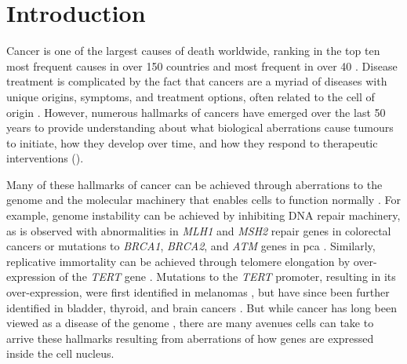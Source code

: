 \chapter{Introduction}
\label{chap:intro}

Cancer is one of the largest causes of death worldwide, ranking in the top ten most frequent causes in over 150 countries and most frequent in over 40 \cite{brayGlobalCancerStatistics2018}.
Disease treatment is complicated by the fact that cancers are a myriad of diseases with unique origins, symptoms, and treatment options, often related to the cell of origin \cite{gilbertsonMappingCancerOrigins2011}.
However, numerous hallmarks of cancers have emerged over the last 50 years to provide understanding about what biological aberrations cause tumours to initiate, how they develop over time, and how they respond to therapeutic interventions \cite{hanahanHallmarksCancer2000,hanahanHallmarksCancerNext2011,flavahanEpigeneticPlasticityHallmarks2017,pavlovaEmergingHallmarksCancer2016} ().


Many of these hallmarks of cancer can be achieved through aberrations to the genome and the molecular machinery that enables cells to function normally \cite{garrawayLessonsCancerGenome2013}.
For example, genome instability can be achieved by inhibiting DNA repair machinery, as is observed with abnormalities in \emph{MLH1} and \emph{MSH2} repair genes in colorectal cancers \cite{lengauerGeneticInstabilitiesHuman1998} or mutations to \emph{BRCA1}, \emph{BRCA2}, and \emph{ATM} genes in \gls{pca} \cite{abeshouseMolecularTaxonomyPrimary2015}.
Similarly, replicative immortality can be achieved through telomere elongation by over-expression of the \emph{TERT} gene \cite{vinagreFrequencyTERTPromoter2013}.
Mutations to the \emph{TERT} promoter, resulting in its over-expression, were first identified in melanomas \cite{huangHighlyRecurrentTERT2013,hornTERTPromoterMutations2013}, but have since been further identified in bladder, thyroid, and brain cancers \cite{vinagreFrequencyTERTPromoter2013,nagarajanRecurrentEpimutationsActivate2014,sternMutationTERTPromoter2015}.
But while cancer has long been viewed as a disease of the genome \cite{hanahanHallmarksCancer2000,garrawayLessonsCancerGenome2013}, there are many avenues cells can take to arrive these hallmarks resulting from aberrations of how genes are expressed inside the cell nucleus.

